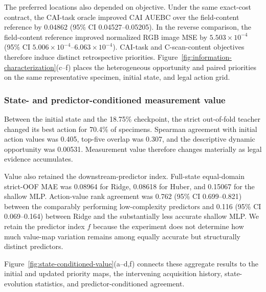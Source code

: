\documentclass[preprint,12pt]{elsarticle}
\begin{document}
The preferred locations also depended on objective. Under the same exact-cost
contract, the CAI-task oracle improved CAI AUEBC over the field-content
reference by 0.04862 (95\% CI 0.04527--0.05205). In the reverse comparison, the
field-content reference improved normalized RGB image MSE by
$5.503\times10^{-4}$ (95\% CI
$5.006\times10^{-4}$--$6.063\times10^{-4}$). CAI-task and C-scan-content
objectives therefore induce distinct retrospective priorities. Figure~\ref{fig:information-characterization}(c--f)
places the heterogeneous opportunity and paired priorities on the same
representative specimen, initial state, and legal action grid.

\subsubsection{State- and predictor-conditioned measurement value}
\label{sec:results-state-predictor}

Between the initial state and the 18.75\% checkpoint, the strict out-of-fold
teacher changed its best action for 70.4\% of specimens. Spearman agreement
with initial action values was 0.405, top-five overlap was 0.307, and the
descriptive dynamic opportunity was 0.00531. Measurement value therefore
changes materially as legal evidence accumulates.

Value also retained the downstream-predictor index. Full-state equal-domain
strict-OOF MAE was 0.08964 for Ridge, 0.08618 for Huber, and 0.15067 for the
shallow MLP. Action-value rank agreement was 0.762 (95\% CI 0.699--0.821)
between the comparably performing low-complexity predictors and 0.116 (95\%
CI 0.069--0.164) between Ridge and the substantially less accurate shallow
MLP. We retain the predictor index $f$ because the experiment does not
determine how much value-map variation remains among equally accurate but
structurally distinct predictors.

Figure~\ref{fig:state-conditioned-value}(a--d,f) connects these aggregate
results to the initial and updated priority maps, the intervening acquisition
history, state-evolution statistics, and predictor-conditioned agreement.
\end{document}
